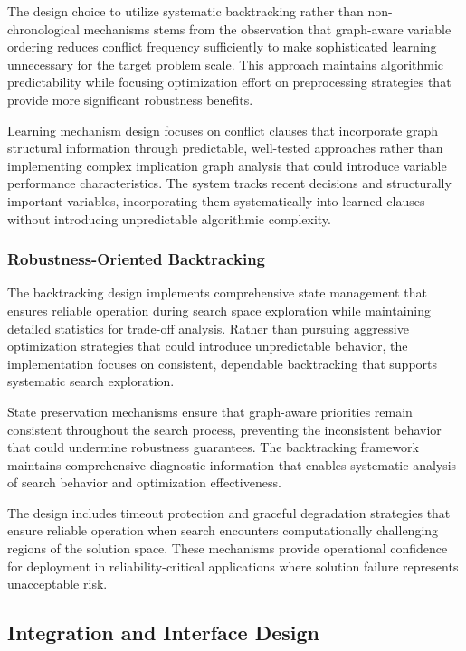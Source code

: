 The design choice to utilize systematic backtracking rather than non-chronological mechanisms stems from the observation that graph-aware variable ordering reduces conflict frequency sufficiently to make sophisticated learning unnecessary for the target problem scale. This approach maintains algorithmic predictability while focusing optimization effort on preprocessing strategies that provide more significant robustness benefits.

Learning mechanism design focuses on conflict clauses that incorporate graph structural information through predictable, well-tested approaches rather than implementing complex implication graph analysis that could introduce variable performance characteristics. The system tracks recent decisions and structurally important variables, incorporating them systematically into learned clauses without introducing unpredictable algorithmic complexity.

\subsubsection{Robustness-Oriented Backtracking}

The backtracking design implements comprehensive state management that ensures reliable operation during search space exploration while maintaining detailed statistics for trade-off analysis. Rather than pursuing aggressive optimization strategies that could introduce unpredictable behavior, the implementation focuses on consistent, dependable backtracking that supports systematic search exploration.

State preservation mechanisms ensure that graph-aware priorities remain consistent throughout the search process, preventing the inconsistent behavior that could undermine robustness guarantees. The backtracking framework maintains comprehensive diagnostic information that enables systematic analysis of search behavior and optimization effectiveness.

The design includes timeout protection and graceful degradation strategies that ensure reliable operation when search encounters computationally challenging regions of the solution space. These mechanisms provide operational confidence for deployment in reliability-critical applications where solution failure represents unacceptable risk.

\subsection{Integration and Interface Design}

